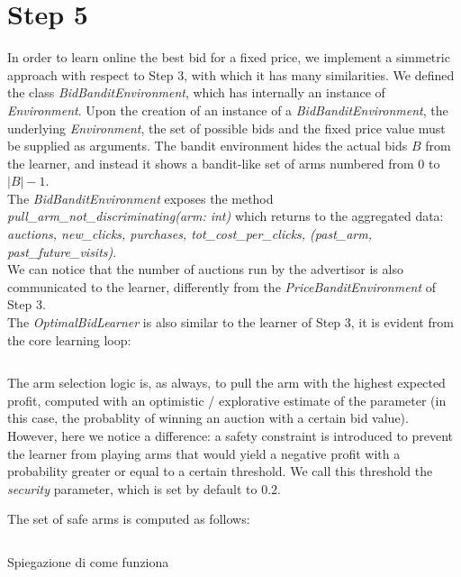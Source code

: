\documentclass[11pt]{article} %
\begin{document}
\clearpage

{\footnotesize}

\clearpage
\section{Step 5}
In order to learn online the best bid for a fixed price, we implement a simmetric approach with respect to Step 3, with which it has  many similarities. We defined the class \textit{BidBanditEnvironment}, which has internally an instance of \textit{Environment}. Upon the creation of an instance of a \textit{BidBanditEnvironment}, the underlying \textit{Environment}, the set of possible bids and the fixed price value must be supplied as arguments. The bandit environment hides the actual bids $B$ from the learner, and instead it shows a bandit-like set of arms numbered from $0$ to $|B|-1$.\\

The \textit{BidBanditEnvironment} exposes the method \textit{pull\_arm\_not\_discriminating(arm: int)} which returns to the aggregated data:\\
\textit{auctions, new\_clicks, purchases, tot\_cost\_per\_clicks, (past\_arm, past\_future\_visits)}.\\
We can notice that the number of auctions run by the advertisor is also communicated to the learner, differently from the \textit{PriceBanditEnvironment} of Step 3.\\

The \textit{OptimalBidLearner} is also similar to the learner of Step 3, it is evident from the core learning loop:
\inputminted{python}{code/step5_learning_loop.py}
The arm selection logic is, as always, to pull the arm with the highest expected profit, computed with an optimistic / explorative estimate of the parameter (in this case, the probablity of winning an auction with a certain bid value). However, here we notice a difference: a safety constraint is introduced to prevent the learner from playing arms that would yield a negative profit with a probability greater or equal to a certain threshold. We call this threshold the \textit{security} parameter, which is set by default to $0.2$.\\

\begin{samepage}
The set of safe arms is computed as follows:
\inputminted{python}{code/step5_safety_constraint.py}
\end{samepage}
{\color{red} Spiegazione di come funziona}\\
\end{document}
